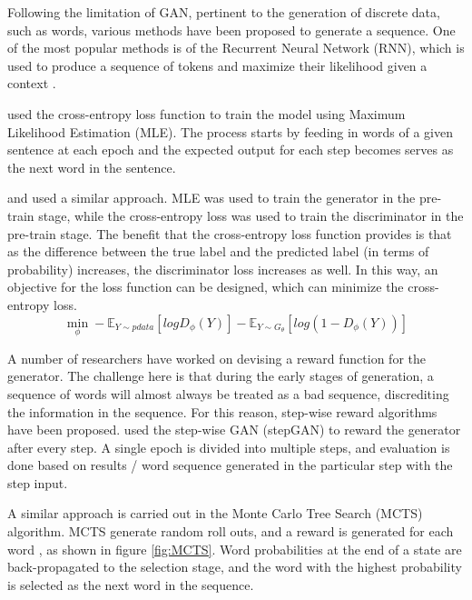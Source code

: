 \documentclass[conference]{IEEEtran}
\begin{document}
Following the limitation of GAN, pertinent to the generation of discrete data, such as words, various methods have been proposed to generate a sequence. One of the most popular methods is of the Recurrent Neural Network (RNN), which is used to produce a sequence of tokens and maximize their likelihood given a context \cite{bahdanau2014neural} \cite{sutskever2014sequence} . 

\citeauthor{kawthekarevaluating} \cite{kawthekarevaluating} used the cross-entropy loss function to train the model using Maximum Likelihood Estimation (MLE). The process starts by feeding in words of a given sentence at each epoch and the expected output for each step becomes serves as the next word in the sentence. 

\citeauthor{yu2016seqgan} and \cite{yu2016seqgan} used a similar approach. MLE was used to  train the generator in the pre-train stage, while the cross-entropy loss was used to train the discriminator in the pre-train stage. The benefit that the cross-entropy loss function provides is that as the difference between the true label and the predicted label (in terms of probability) increases, the discriminator loss increases as well. In this way, an objective for the loss function can be designed, which can minimize the cross-entropy loss.
\begin{equation}\label{eq_cross}
\min_{\phi}- \mathbb{E}_{Y \sim pdata}[log D_\phi(Y)]-\mathbb{E}_{Y \sim G_\theta}[log(1-D_\phi(Y))]
\end{equation}

A number of researchers have worked on devising a reward function for the generator. The challenge here is that during the early stages of generation, a sequence of words will almost always be treated as a bad sequence, discrediting the information in the sequence. For this reason, step-wise reward algorithms have been proposed. \citeauthor{tuan2018improving} \cite{tuan2018improving} used the step-wise GAN (stepGAN) to reward the generator after every step. A single epoch is divided into multiple steps, and evaluation is done based on results / word sequence generated in the particular step with the step input. 

A similar approach is carried out in the Monte Carlo Tree Search (MCTS) algorithm. MCTS generate random roll outs, and a reward is generated for each word \cite{Browne12asurvey, kawthekarevaluating}, as shown in figure \ref{fig:MCTS}. Word probabilities at the end of a state are back-propagated to the selection stage, and the word with the highest probability is selected as the next word in the sequence. 
\end{document}

